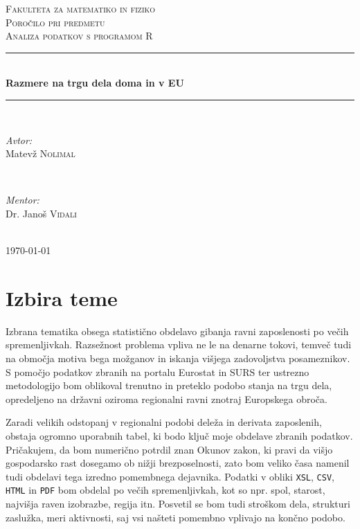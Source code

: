\documentclass[11pt,a4paper]{article}
\begin{document}
\begin{titlepage}

\newcommand{\HRule}{\rule{\linewidth}{0.5mm}}

\center

\textsc{\LARGE Fakulteta za matematiko in fiziko}\\[1.5cm]
\textsc{\Large Poročilo pri predmetu}\\[0.5cm]
\textsc{\large Analiza podatkov s programom R}\\[0.5cm]
\HRule \\[0.4cm]
{ \huge \bfseries Razmere na trgu dela doma in v EU}\\[0.4cm] 
\HRule \\[1.5cm]


\begin{minipage}{0.4\textwidth}
\begin{flushleft} \large
\emph{Avtor:}\\
Matevž \textsc{Nolimal}
\end{flushleft}
\end{minipage}
~
\begin{minipage}{0.4\textwidth}
\begin{flushright} \large
\emph{Mentor:} \\
Dr. Janoš \textsc{Vidali}
\end{flushright}
\end{minipage}\\[4cm]

{\large \today}\\[3cm] 
\vfill

\end{titlepage}


\section{Izbira teme}

Izbrana tematika obsega statistično obdelavo gibanja ravni zaposlenosti po večih spremenljivkah. Razsežnost problema vpliva ne le na denarne tokovi, temveč tudi na območja motiva bega možganov in iskanja višjega zadovoljstva posameznikov. S pomočjo podatkov zbranih na portalu Eurostat in SURS ter ustrezno metodologijo bom oblikoval trenutno in preteklo podobo stanja na trgu dela, opredeljeno na državni oziroma regionalni ravni znotraj Europskega obroča. 

Zaradi velikih odstopanj v regionalni podobi deleža in derivata zaposlenih, obstaja ogromno uporabnih tabel, ki bodo ključ moje obdelave zbranih podatkov. Pričakujem, da bom numerično potrdil znan Okunov zakon, ki pravi da višjo gospodarsko rast dosegamo ob nižji brezposelnosti, zato bom veliko časa namenil tudi obdelavi tega izredno pomembnega dejavnika. Podatki v obliki \verb|XSL|, \verb|CSV|, \verb|HTML| in \verb|PDF| bom obdelal po večih spremenljivkah, kot so npr. spol, starost, najvišja raven izobrazbe, regija itn. Posvetil se bom tudi stroškom dela, strukturi zaslužka, meri aktivnosti, saj vsi našteti pomembno vplivajo na končno podobo. 
\end{document}
